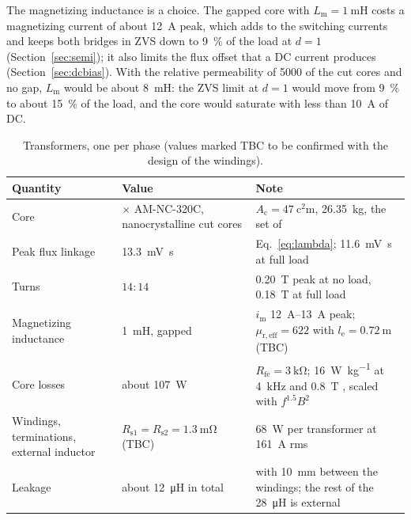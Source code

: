 \documentclass[12pt,a4paper]{scrartcl}
\newcommand{\ped}[1]{_{\mathrm{#1}}}
\begin{document}
\begin{onehalfspace}
The magnetizing inductance is a choice. The gapped core with $L\ped{m} = \SI{1}{\milli\henry}$ costs a magnetizing current of about \SI{12}{\ampere} peak, which adds to the switching currents and keeps both bridges in ZVS down to \SI{9}{\percent} of the load at $d = 1$ (Section~\ref{sec:semi}); it also limits the flux offset that a DC current produces (Section~\ref{sec:dcbias}). With the relative permeability of 5000 of the cut cores \cite{sst_doc} and no gap, $L\ped{m}$ would be about \SI{8}{\milli\henry}: the ZVS limit at $d = 1$ would move from \SI{9}{\percent} to about \SI{15}{\percent} of the load, and the core would saturate with less than \SI{10}{\ampere} of DC.

\begin{table}[H]
	\centering
	\captionsetup{width=0.9\textwidth, font=small}
	\caption{Transformers, one per phase (values marked TBC to be confirmed with the design of the windings).}
	\label{tab:transformer}
	\small
	\begin{tabularx}{0.97\textwidth}{@{} >{\raggedright\arraybackslash}p{} >{\raggedright\arraybackslash}p{} X @{}}
		\toprule
		\textbf{Quantity} & \textbf{Value} & \textbf{Note} \\
		\midrule
		Core & 3 $\times$ AM-NC-320C, nanocrystalline cut cores & $A\ped{c} = \SI{47}{\square\centi\metre}$, \SI{26.35}{\kilogram}, the set of \cite{sst_doc} \\
		Peak flux linkage & \SI{13.3}{\milli\volt\second} & Eq.~\eqref{eq:lambda}; \SI{11.6}{\milli\volt\second} at full load \\
		Turns & $14:14$ & \SI{0.20}{\tesla} peak at no load, \SI{0.18}{\tesla} at full load \\
		Magnetizing inductance & \SI{1}{\milli\henry}, gapped & $i\ped{m}$ \SIrange{12}{13}{\ampere} peak; $\mu\ped{r,eff} = 622$ with $l\ped{e} = \SI{0.72}{\metre}$ (TBC) \\
		Core losses & about \SI{107}{\watt} & $R\ped{fe} = \SI{3}{\kilo\ohm}$; \SI{16}{\watt\per\kilogram} at \SI{4}{\kilo\hertz} and \SI{0.8}{\tesla} \cite{sst_doc}, scaled with $f^{1.5}B^2$ \\
		Windings, terminations, external inductor & $R\ped{s1} = R\ped{s2} = \SI{1.3}{\milli\ohm}$ (TBC) & \SI{68}{\watt} per transformer at \SI{161}{\ampere} rms \\
		Leakage & about \SI{12}{\micro\henry} in total & with \SI{10}{\milli\metre} between the windings; the rest of the \SI{28}{\micro\henry} is external \\
		\bottomrule
	\end{tabularx}
\end{table}


\end{onehalfspace}
\end{document}
